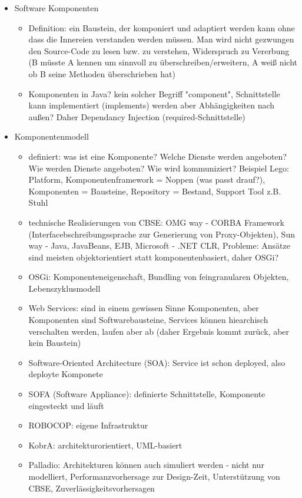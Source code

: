 \documentclass[paper=a4, fontsize=11pt]{scrartcl} %
\numberwithin{equation}{section} %
\numberwithin{figure}{section} %
\numberwithin{table}{section} %
\begin{document}
\begin{itemize}
\begin{minipage}{.5\textwidth}
  \end{minipage}
  \item Software Komponenten
  \begin{itemize}
    \item Definition: ein Baustein, der komponiert und adaptiert werden kann ohne dass die Innereien verstanden werden müssen. Man wird nicht gezwungen den Source-Code zu lesen bzw. zu verstehen, Widerspruch zu Vererbung (B müsste A kennen um sinnvoll zu überschreiben/erweitern, A weiß nicht ob B seine Methoden überschrieben hat)
    \item Komponenten in Java? kein solcher Begriff "component", Schnittstelle kann implementiert (implements) werden aber Abhängigkeiten nach außen? Daher Dependancy Injection (required-Schnittstelle)
  \end{itemize}
  \item Komponentenmodell
  \begin{itemize}
    \item definiert: was ist eine Komponente? Welche Dienste werden angeboten? Wie werden Dienste angeboten? Wie wird kommuniziert? Beispiel Lego: Platform, Komponentenframework = Noppen (was passt drauf?), Komponenten = Bausteine, Repository = Bestand, Support Tool z.B. Stuhl
    \item technische Realisierungen von CBSE: OMG way - CORBA Framework (Interfacebschreibungssprache zur Generierung von Proxy-Objekten), Sun way - Java, JavaBeans, EJB, Microsoft - .NET CLR, Probleme: Ansätze sind meisten objektorientiert statt komponentenbasiert, daher OSGi?
    \item OSGi: Komponenteneigenschaft, Bundling von feingranularen Objekten, Lebenszyklusmodell
    \item Web Services: sind in einem gewissen Sinne Komponenten, aber Komponenten sind Softwarebausteine, Services können hiearchisch verschalten werden, laufen aber ab (daher Ergebnis kommt zurück, aber kein Baustein)
    \item Software-Oriented Architecture (SOA): Service ist schon deployed, also deployte Komponete
    \item SOFA (Software Appliance): definierte Schnittstelle, Komponente eingesteckt und läuft
    \item ROBOCOP: eigene Infrastruktur
    \item KobrA: architekturorientiert, UML-basiert
    \item Palladio: Architekturen können auch simuliert werden - nicht nur modelliert, Performanzvorhersage zur Design-Zeit, Unterstützung von CBSE, Zuverlässigkeitsvorhersagen

\end{itemize}
\end{itemize}
\end{document}
